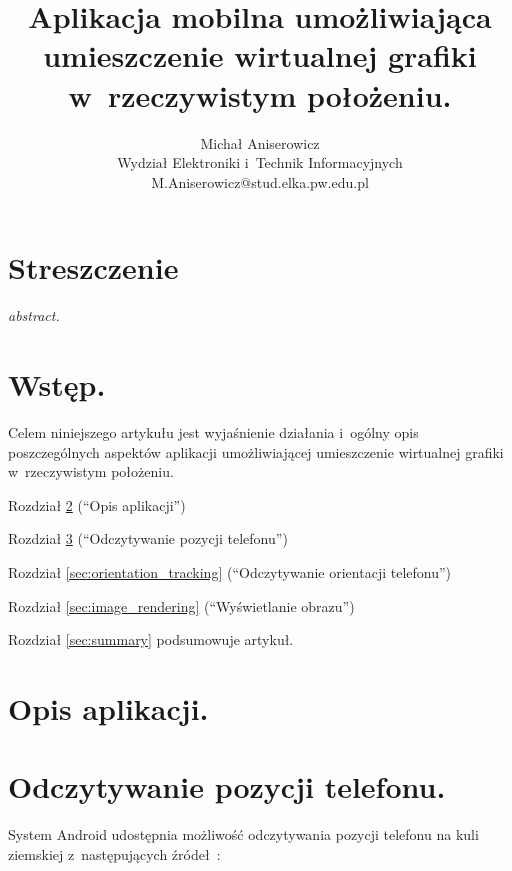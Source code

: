 \documentclass[a4paper,twocolumn,11pt]{article}
\title{{\mycfsb{14} Aplikacja mobilna umożliwiająca umieszczenie wirtualnej grafiki w~rzeczywistym położeniu.}}
\author{{\mycfs{12} Michał Aniserowicz} \\ {\mycfs{11} Wydział Elektroniki i~Technik Informacyjnych} \\ {\mycfs{11} M.Aniserowicz@stud.elka.pw.edu.pl}}
\date{}
\begin{document}
\vspace{1.5cm}

\maketitle




\section*{Streszczenie}

\emph{abstract.}




\section{Wstęp.}

Celem niniejszego artykułu jest wyjaśnienie działania i~ogólny opis poszczególnych aspektów aplikacji umożliwiającej umieszczenie wirtualnej grafiki w~rzeczywistym położeniu.

Rozdział \ref{sec:app_description} (``Opis aplikacji'')

Rozdział \ref{sec:position_tracking} (``Odczytywanie pozycji telefonu'')

Rozdział \ref{sec:orientation_tracking} (``Odczytywanie orientacji telefonu'')

Rozdział \ref{sec:image_rendering} (``Wyświetlanie obrazu'')

Rozdział \ref{sec:summary} podsumowuje artykuł.




\section{Opis aplikacji.} \label{sec:app_description}




\section{Odczytywanie pozycji telefonu.} \label{sec:position_tracking}

System Android udostępnia możliwość odczytywania pozycji telefonu na kuli ziemskiej z~następujących źródeł~\cite{and:loc}:
\end{document}
